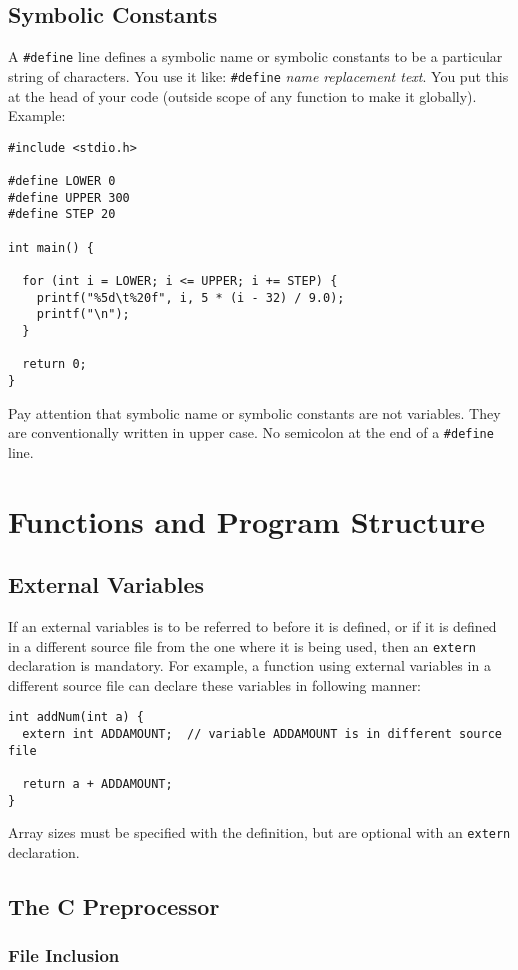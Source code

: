 \documentclass[12pt]{article}
\begin{document}
\subsection{Symbolic Constants}
\label{sec:org6dd946a}
A \texttt{\#define} line defines a symbolic name or symbolic constants to be a particular string of characters. You use it like: \texttt{\#define} \emph{name} \emph{replacement text}. You put this at the head of your code (outside scope of any function to make it globally). Example:
\begin{verbatim}
#include <stdio.h>

#define LOWER 0
#define UPPER 300
#define STEP 20

int main() {

  for (int i = LOWER; i <= UPPER; i += STEP) {
    printf("%5d\t%20f", i, 5 * (i - 32) / 9.0);
    printf("\n");
  }

  return 0;
}
\end{verbatim}
Pay attention that symbolic name or symbolic constants are not variables. They are conventionally written in upper case. No semicolon at the end of a \texttt{\#define} line.
\section{Functions and Program Structure}
\label{sec:org77b80b4}
\subsection{External Variables}
\label{sec:orge3414b5}
If an external variables is to be referred to before it is defined, or if it is defined in a different source file from the one where it is being used, then an \texttt{extern} declaration is mandatory. For example, a function using external variables in a different source file can declare these variables in following manner:
\begin{verbatim}
int addNum(int a) {
  extern int ADDAMOUNT;  // variable ADDAMOUNT is in different source file

  return a + ADDAMOUNT;
}
\end{verbatim}
Array sizes must be specified with the definition, but are optional with an \texttt{extern} declaration.
\subsection{The C Preprocessor}
\label{sec:org866cf7d}
\subsubsection{File Inclusion}
\label{sec:org6ba2a14}
\end{document}

